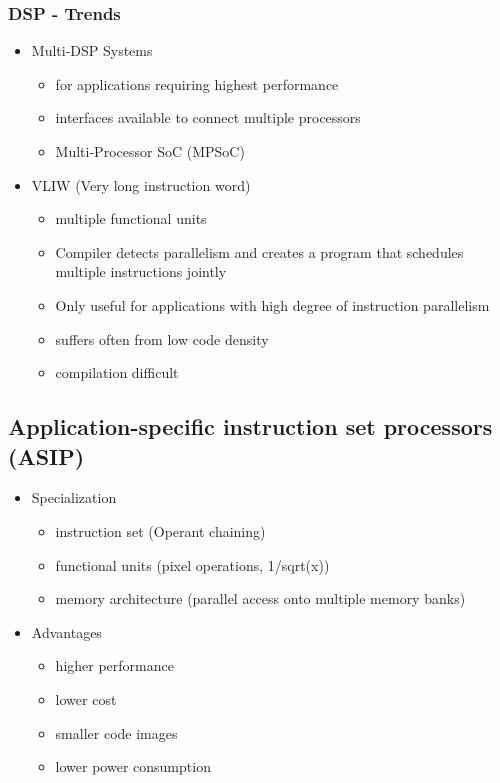 \subsubsection{DSP - Trends}
\begin{itemize}
	\item Multi-DSP Systems
	\begin{itemize}
		\item for applications requiring highest performance
		\item interfaces available to connect multiple processors
		\item Multi-Processor SoC (MPSoC)
	\end{itemize}
	\item VLIW (Very long instruction word)
	\begin{itemize}
		\item multiple functional units
		\item Compiler detects parallelism and creates a program that schedules multiple instructions jointly
		\item Only useful for applications with high degree of instruction parallelism
		\item suffers often from low code density
		\item compilation difficult
	\end{itemize}
\end{itemize}

\subsection{Application-specific instruction set processors (ASIP)}
\begin{itemize}
	\item Specialization
	\begin{itemize}
		\item instruction set (Operant chaining)
		\item functional units (pixel operations, 1/sqrt(x))
		\item memory architecture (parallel access onto multiple memory banks)
	\end{itemize}
	\item Advantages
	\begin{itemize}
		\item higher performance
		\item lower cost
		\item smaller code images
		\item lower power consumption 
	\end{itemize}
\end{itemize}

